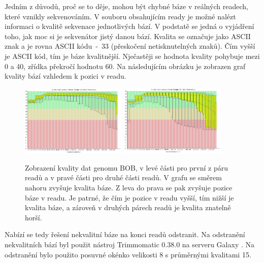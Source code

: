 \documentclass[czech,DP]{thesiskiv}
\numberwithin{equation}{section}
\begin{document}
\noindent
Jedním z důvodů, proč se to děje, mohou být chybné báze v reálných readech, které vznikly sekvenováním. V souboru obsahujícím ready je možné nalézt informaci o kvalitě sekvenace jednotlivých bází. V podstatě se jedná o vyjádření toho, jak moc si je sekvenátor jistý danou bází. Kvalita se označuje jako ASCII znak a je rovna ASCII kódu~-~33 (přeskočení netisknutelných znaků). Čím vyšší je ASCII kód, tím je báze kvalitnější. Nječastěji se hodnota kvality pohybuje mezi 0 a 40, zřídka překročí hodnotu 60. Na následujícím obrázku je zobrazen graf kvality bází vzhledem k pozici v readu.

\begin{figure}[H]		
		\centering
		\includegraphics[width=190px]{./img/quality_graf_bob_no_trim_r1.png}
		\includegraphics[width=190px]{./img/quality_graf_bob_no_trim_r2.png}
		\caption{Zobrazení kvality dat genomu BOB, v levé části pro první z páru readů a v pravé části pro druhé části readů. V grafu se směrem nahoru zvyšuje kvalita báze. Z leva do prava se pak zvyšuje pozice báze v readu. Je patrné, že čím je pozice v readu vyšší, tím nižší je kvalita báze, a zároveň v druhých párech readů je kvalita znatelně horší.}
		\label{fig:graf_quality_no_trim}
\end{figure}


\noindent
Nabízí se tedy řešení nekvalitní báze na konci readů odstranit. Na odstranění nekvalitních bází byl použit nástroj Trimmomatic 0.38.0 na serveru Galaxy \cite{galaxy}. Na odstranění bylo použito posuvné okénko velikosti 8 s průměrnými kvalitami 15. 
\end{document}
